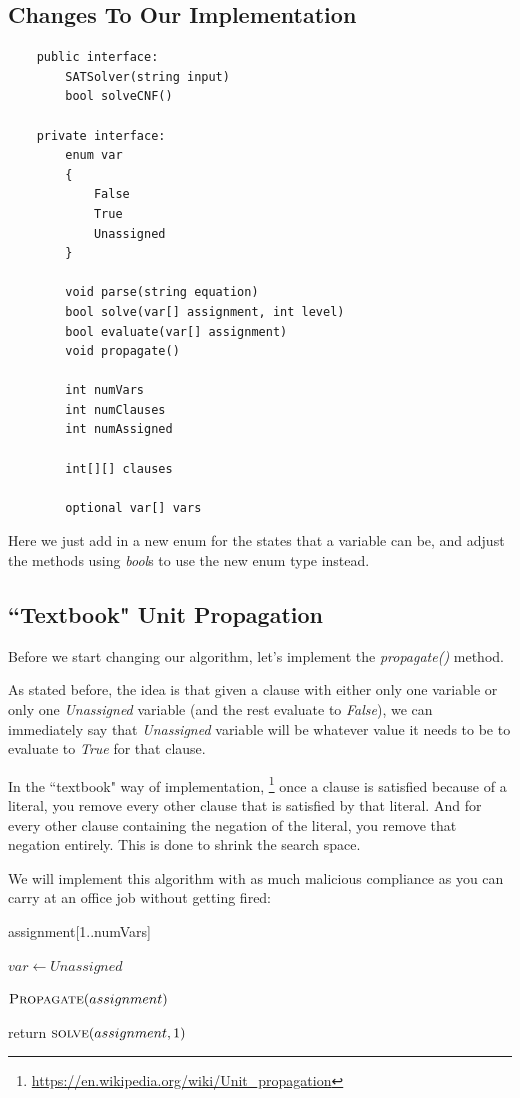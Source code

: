 \subsection{Changes To Our Implementation}

\begin{lstlisting}
    public interface:
        SATSolver(string input)
        bool solveCNF()

    private interface:
        enum var
        {
            False
            True
            Unassigned
        }

        void parse(string equation)
        bool solve(var[] assignment, int level)
        bool evaluate(var[] assignment)
        void propagate()

        int numVars
        int numClauses
        int numAssigned

        int[][] clauses

        optional var[] vars
\end{lstlisting}

Here we just add in a new enum for the states that a variable can be, and
adjust the methods using \textit{bool}s to use the new enum type instead.

\subsection{``Textbook" Unit Propagation}

Before we start changing our algorithm, let's implement the
\textit{propagate()} method.

As stated before, the idea is that given a clause with either only one variable
or only one \textit{Unassigned} variable (and the rest evaluate to
\textit{False}), we can immediately say that \textit{Unassigned} variable will
be whatever value it needs to be to evaluate to \textit{True} for that clause.

In the ``textbook" way of implementation,
\footnote{\url{https://en.wikipedia.org/wiki/Unit_propagation}} 
once a clause is satisfied because of a literal, you remove every other
clause that is satisfied by that literal. And for every other clause containing 
the negation of the literal, you remove that negation entirely. This is done to shrink the 
search space.

We will implement this algorithm with as much malicious compliance as you can 
carry at an office job without getting fired:

\begin{algorithm}[H]
\caption{Main Solving Method}\label{alg:9}
\begin{algorithmic}[1]


\State assignment[1..numVars] 

    \State $var \gets Unassigned$
\EndFor

$\Call{Propagate}{assignment}$

\State return $\Call{solve}{assignment, 1}$

\EndProcedure
\end{algorithmic}
\end{algorithm}

